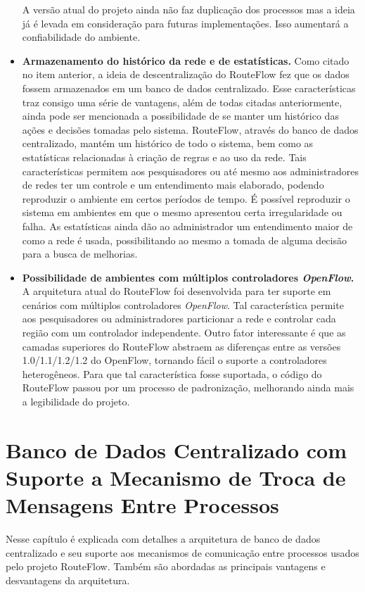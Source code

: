 \begin{itemize}
A versão atual do projeto ainda
não faz duplicação dos processos mas a ideia já é levada em
consideração para futuras implementações. Isso aumentará 
a confiabilidade do ambiente.
\item \textbf{Armazenamento do histórico da rede e de estatísticas.}
Como citado no item anterior, a ideia de descentralização do RouteFlow
fez que os dados fossem armazenados em um banco de 
dados centralizado. Esse características traz consigo
uma série de vantagens, além de todas citadas anteriormente, ainda pode ser 
mencionada a possibilidade
de se manter um histórico das ações e decisões tomadas pelo
sistema. RouteFlow, através do banco de dados centralizado, mantém 
um histórico de todo o sistema, bem como as estatísticas relacionadas 
à criação de regras e ao uso da rede. Tais características permitem
 aos pesquisadores
ou até mesmo aos administradores de redes ter um controle 
e um entendimento mais elaborado, podendo reproduzir o ambiente
em certos períodos de tempo. É possível reproduzir o sistema
em ambientes em que o mesmo apresentou certa irregularidade ou
falha. 
As estatísticas ainda dão ao administrador um entendimento maior 
de como a rede é usada, possibilitando ao mesmo a tomada de
alguma decisão para a busca de melhorias.
\item \textbf{Possibilidade de ambientes com múltiplos controladores
\textit{OpenFlow}.} A arquitetura atual do RouteFlow foi
desenvolvida para ter suporte em cenários com múltiplos controladores
\textit{OpenFlow}. Tal característica permite aos pesquisadores
ou administradores particionar a rede e controlar cada região
com um controlador independente. Outro fator interessante é
que as camadas superiores do RouteFlow abstraem as diferenças
entre as versões 1.0/1.1/1.2/1.2 do OpenFlow, tornando fácil o
suporte a controladores heterogêneos. 
Para que tal característica fosse suportada, o código do RouteFlow
passou por um processo de padronização, melhorando ainda 
mais a legibilidade do projeto.
\end{itemize}

\section{Banco de Dados Centralizado com Suporte a Mecanismo
de Troca de Mensagens Entre Processos}

Nesse capítulo é explicada com detalhes a arquitetura de 
banco de dados centralizado e seu suporte aos mecanismos
de comunicação entre processos usados pelo projeto RouteFlow.
Também são abordadas as principais vantagens e desvantagens
da arquitetura.

